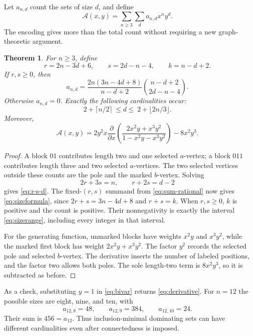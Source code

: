 \documentclass[11pt,letterpaper]{article}
\numberwithin{equation}{section}
\newtheorem{theorem}{Theorem}[section]
\theoremstyle{definition}
\theoremstyle{remark}
\newcommand{\A}{\mathcal A}
\begin{document}
Let $a_{n,d}$ count the sets of size $d$, and define
\[
 \A(x,y)=\sum_{n\ge3}\sum_d a_{n,d}x^ny^d.
\]
The encoding gives more than the total count without requiring a
new graph-theoretic argument.

\begin{theorem}\label{thm:size}
For $n\ge3$, define
\begin{equation}\label{eq:r-s-d}
 r=2n-3d+6,\qquad s=2d-n-4,\qquad k=n-d+2.
\end{equation}
If $r,s\ge0$, then
\begin{equation}\label{eq:sizeformula}
\boxed{\displaystyle
 a_{n,d}=
 \frac{2n(3n-4d+8)}{n-d+2}
 \binom{n-d+2}{2d-n-4}.}
\end{equation}
Otherwise $a_{n,d}=0$. Exactly the following cardinalities occur:
\begin{equation}\label{eq:sizerange}
 2+\lceil n/2\rceil\ \le d\le\ 2+\lfloor 2n/3\rfloor.
\end{equation}
Moreover,
\begin{equation}\label{eq:bivar}
 \boxed{\displaystyle
 \A(x,y)=2y^2x\frac{\partial}{\partial x}
 \left(\frac{2x^2y+x^3y^2}{1-x^2y-x^3y^2}\right)-8x^2y^3.}
\end{equation}
\end{theorem}
\begin{proof}
A block $01$ contributes length two and one selected $a$-vertex;
a block $011$ contributes length three and two selected $a$-vertices.
The two selected vertices outside these counts are the pole and the
marked $b$-vertex. Solving
\[
 2r+3s=n,\qquad r+2s=d-2
\]
gives \eqref{eq:r-s-d}. The fixed-$(r,s)$ summand from
\eqref{eq:sum-rational} now gives \eqref{eq:sizeformula}, since
$2r+s=3n-4d+8$ and $r+s=k$. When $r,s\ge0$, $k$ is positive and
the count is positive. Their nonnegativity is exactly the interval
\eqref{eq:sizerange}, including every integer in that interval.

For the generating function, unmarked blocks have weights $x^2y$
and $x^3y^2$, while the marked first block has weight
$2x^2y+x^3y^2$. The factor $y^2$ records the selected pole and
selected $b$-vertex. The derivative inserts the number of labeled
positions, and the factor two allows both poles. The sole
length-two term is $8x^2y^3$, so it is subtracted as before.
\end{proof}

As a check, substituting $y=1$ in \eqref{eq:bivar} returns
\eqref{eq:derivative}. For $n=12$ the possible sizes are eight,
nine, and ten, with
\[
 a_{12,8}=48,\qquad a_{12,9}=384,\qquad a_{12,10}=24.
\]
Their sum is $456=a_{12}$. Thus inclusion-minimal dominating sets
can have different cardinalities even after connectedness is imposed.
\end{document}
